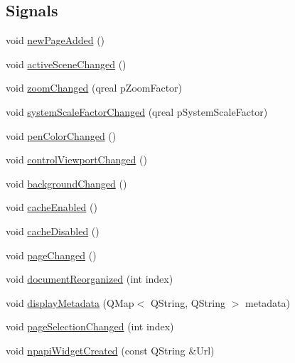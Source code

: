 \subsection*{Signals}
\begin{DoxyCompactItemize}
\item 
void \hyperlink{class_u_b_board_controller_ab3972f04b8dd9459ac45397447dda7f7}{new\-Page\-Added} ()
\item 
void \hyperlink{class_u_b_board_controller_a55bd7934f6385adecd1401a8b34fb851}{active\-Scene\-Changed} ()
\item 
void \hyperlink{class_u_b_board_controller_a916c350732ef05c8693d82a6192042da}{zoom\-Changed} (qreal p\-Zoom\-Factor)
\item 
void \hyperlink{class_u_b_board_controller_a696505e51a5a2c14cfaaffc2f2be590d}{system\-Scale\-Factor\-Changed} (qreal p\-System\-Scale\-Factor)
\item 
void \hyperlink{class_u_b_board_controller_a762afc02398aec4c9136e00984cc3120}{pen\-Color\-Changed} ()
\item 
void \hyperlink{class_u_b_board_controller_a43951f02a518680a34c38a1ac4533fc0}{control\-Viewport\-Changed} ()
\item 
void \hyperlink{class_u_b_board_controller_ad09c4f1efd56c86ee5987e5ca29bab59}{background\-Changed} ()
\item 
void \hyperlink{class_u_b_board_controller_a7a7062ac8429cb9395797607ac8493bb}{cache\-Enabled} ()
\item 
void \hyperlink{class_u_b_board_controller_aa3399312bf446d0c3a0d98dd03746732}{cache\-Disabled} ()
\item 
void \hyperlink{class_u_b_board_controller_aa19e0faf07ab9cebd4d4dbf30bc074a3}{page\-Changed} ()
\item 
void \hyperlink{class_u_b_board_controller_a55b3aa45ecaf7662bb7aeb1359b3dcfe}{document\-Reorganized} (int index)
\item 
void \hyperlink{class_u_b_board_controller_a134accb6745f0bc3683bcc1fffd48872}{display\-Metadata} (Q\-Map$<$ Q\-String, Q\-String $>$ metadata)
\item 
void \hyperlink{class_u_b_board_controller_a5f23d849d22a50ade6d1da830b181def}{page\-Selection\-Changed} (int index)
\item 
void \hyperlink{class_u_b_board_controller_a3e3d5b9ac6e4806b2bd843ba1d5919fe}{npapi\-Widget\-Created} (const Q\-String \&Url)
\end{DoxyCompactItemize}
